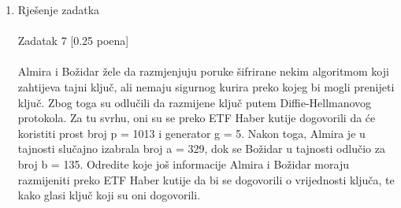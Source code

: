 \documentclass[12pt]{article}
\begin{document}
\begin{enumerate}
		\newpage
		\item Rješenje zadatka \\
		\\
		Zadatak 7 [0.25 poena] \\
		\\
Almira i Božidar žele da razmjenjuju poruke šifrirane nekim algoritmom koji zahtijeva tajni
ključ, ali nemaju sigurnog kurira preko kojeg bi mogli prenijeti ključ. Zbog toga su odlučili da
razmijene ključ putem Diffie-Hellmanovog protokola. Za tu svrhu, oni su se preko ETF Haber
kutije dogovorili da će koristiti prost broj p = 1013 i generator g = 5. Nakon toga, Almira je u
tajnosti slučajno izabrala broj a = 329, dok se Božidar u tajnosti odlučio za broj b = 135.
Odredite koje još informacije Almira i Božidar moraju razmijeniti preko ETF Haber kutije da
bi se dogovorili o vrijednosti ključa, te kako glasi ključ koji su oni dogovorili. \\



\end{enumerate}
\end{document}
